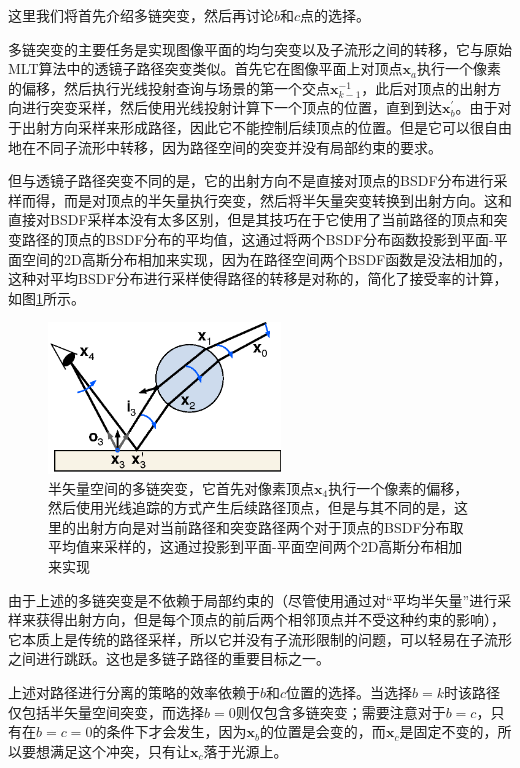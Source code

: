 这里我们将首先介绍多链突变，然后再讨论$b$和$c$点的选择。

多链突变的主要任务是实现图像平面的均匀突变以及子流形之间的转移，它与原始MLT算法中的透镜子路径突变类似。首先它在图像平面上对顶点$\mathbf{x}_a$执行一个像素的偏移，然后执行光线投射查询与场景的第一个交点$\mathbf{x}^{-1}_{k-1}$，此后对顶点的出射方向进行突变采样，然后使用光线投射计算下一个顶点的位置，直到到达$\mathbf{x}^{'}_b$。由于对于出射方向采样来形成路径，因此它不能控制后续顶点的位置。但是它可以很自由地在不同子流形中转移，因为路径空间的突变并没有局部约束的要求。

但与透镜子路径突变不同的是，它的出射方向不是直接对顶点的BSDF分布进行采样而得，而是对顶点的半矢量执行突变，然后将半矢量突变转换到出射方向。这和直接对BSDF采样本没有太多区别，但是其技巧在于它使用了当前路径的顶点和突变路径的顶点的BSDF分布的平均值，这通过将两个BSDF分布函数投影到平面-平面空间的2D高斯分布相加来实现，因为在路径空间两个BSDF函数是没法相加的，这种对平均BSDF分布进行采样使得路径的转移是对称的，简化了接受率的计算，如图\ref{f:mlt-multi-chain-perturbation}所示。

\begin{figure}
	\sidecaption
	\includegraphics[width=0.55\textwidth]{figures/mlt/multi-chain-perturbation}
	\caption{半矢量空间的多链突变，它首先对像素顶点$\mathbf{x}_4$执行一个像素的偏移，然后使用光线追踪的方式产生后续路径顶点，但是与其不同的是，这里的出射方向是对当前路径和突变路径两个对于顶点的BSDF分布取平均值来采样的，这通过投影到平面-平面空间两个2D高斯分布相加来实现}
	\label{f:mlt-multi-chain-perturbation}
\end{figure}

由于上述的多链突变是不依赖于局部约束的（尽管使用通过对“平均半矢量”进行采样来获得出射方向，但是每个顶点的前后两个相邻顶点并不受这种约束的影响），它本质上是传统的路径采样，所以它并没有子流形限制的问题，可以轻易在子流形之间进行跳跃。这也是多链子路径的重要目标之一。

上述对路径进行分离的策略的效率依赖于$b$和$c$位置的选择。当选择$b=k$时该路径仅包括半矢量空间突变，而选择$b=0$则仅包含多链突变；需要注意对于$b=c$，只有在$b=c=0$的条件下才会发生，因为$\mathbf{x}_b$的位置是会变的，而$\mathbf{x}_c$是固定不变的，所以要想满足这个冲突，只有让$\mathbf{x}_c$落于光源上。

